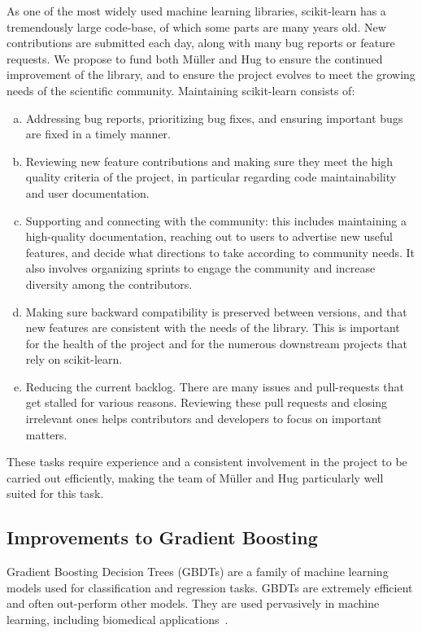 \documentclass[11pt]{article}  %
\begin{document}
As one of the most widely used machine learning libraries, scikit-learn has
a tremendously large code-base, of which some parts are many years old. New contributions are submitted each day, along with many bug reports or
feature requests. We propose to fund both M\"uller and Hug to ensure the
continued improvement of the library, and to ensure the project evolves to
meet the growing needs of the scientific community. Maintaining scikit-learn consists of:

\begin{enumerate}[a)]
\item Addressing bug reports, prioritizing bug fixes, and ensuring important bugs are fixed in a timely manner.
\item Reviewing new feature contributions and making sure they meet the high
quality criteria of the project, in particular regarding code
maintainability and user documentation.
\item Supporting and connecting with the community: this includes
maintaining a high-quality documentation, reaching out to users to advertise
new useful features, and decide what directions to take according to community
needs. It also involves organizing sprints to engage the community and
increase diversity among the contributors.
\item Making sure backward compatibility is preserved between versions, and
that new features are consistent with the needs of the library. This is
important for the health of the project and for the numerous downstream
projects that rely on scikit-learn.
\item Reducing the current backlog. There are many issues and pull-requests that get stalled for various reasons. Reviewing these pull requests and closing irrelevant ones helps contributors and developers to focus on important matters.
\end{enumerate}

These tasks require experience and a consistent involvement in the project
to be carried out efficiently, making the team of M\"uller and Hug
particularly well suited for this task.

\subsection{Improvements to Gradient Boosting}

Gradient Boosting Decision Trees (GBDTs) are a family of machine learning
models used for classification and regression tasks. GBDTs are extremely
efficient and often out-perform other models. They are used pervasively in
machine learning, including biomedical applications~\cite{chen2019hiv, shah2019development}.
\end{document}

